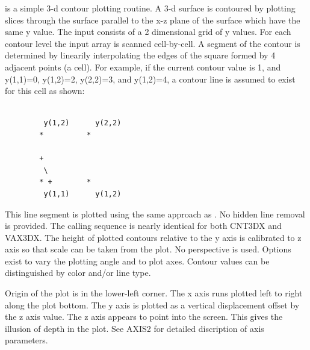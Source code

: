 \documentclass[11pt]{report}
\begin{document}
 is a simple 3-d contour plotting routine.  A 3-d surface is
contoured by plotting slices through the surface parallel to the x-z plane
of the surface which have the same y value.  The input consists of a 2
dimensional grid of y values.  For each contour level the input array
is scanned cell-by-cell.  A segment of the contour is determined by linearily
interpolating the edges of the square formed by 4 adjacent points (a cell).
For example, if the current contour value is 1, and y(1,1)=0, y(1,2)=2,
y(2,2)=3, and y(1,2)=4, a contour line is assumed to exist for this
cell as shown:
\begin{verbatim}

         y(1,2)      y(2,2)
        *          *
 
        +
         \
        * +        *
         y(1,1)      y(1,2)

\end{verbatim}
This line segment is plotted using the same approach as .
No hidden line removal is provided.  The calling sequence is nearly
identical for both CNT3DX and VAX3DX. The height of plotted contours
relative to the y axis is calibrated to z axis so that scale can be
taken from the plot.  No perspective is used.  Options exist to vary
the plotting angle and to plot axes.  Contour values can be
distinguished by color and/or line type.

Origin of the plot is in the lower-left corner.  The x axis runs
plotted left to right along the plot bottom.  The y axis is plotted
as a vertical displacement offset by the z axis value.  The z axis appears
to point into the screen.  This gives the illusion of depth in the plot.
See AXIS2 for detailed discription of axis parameters.
\end{document}
